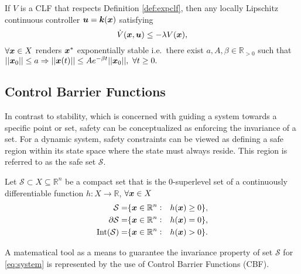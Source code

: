 \begin{theorem}\label{th:clftexp}
If $V$ is a CLF that respects Definition \ref{def:expclf}, then any locally Lipschitz continuous controller $\boldsymbol{u}=\boldsymbol{k}(\boldsymbol{x})$ satisfying 
\begin{equation}
\dot{V}(\boldsymbol{x},\boldsymbol{u}) \leq -\lambda V(\boldsymbol{x}),
\end{equation}
$\forall \boldsymbol{x} \in X$ renders $\boldsymbol{x}^*$ exponentially stable i.e.~there exist $a,A,\beta \in \mathbb{R}_{>0}$ such that 
$|| \boldsymbol{x}_0 || \leq a \Rightarrow || \boldsymbol{x}(t) || \leq Ae^{-\beta t}|| \boldsymbol{x}_0 ||,~\forall t\geq 0.$
\end{theorem}

\subsection{Control Barrier Functions}

In contrast to stability, which is concerned with guiding a system towards a specific point or set, safety can be conceptualized as enforcing the invariance of a set. For a dynamic system, safety constraints can be viewed as defining a safe region within its state space
where the state must always reside. This region is referred to as the safe set $\mathcal{S}$. 

\begin{definition} Let $\mathcal{S}\subset X\subseteq \mathbb{R}^n$ be a compact set that is the $0$-superlevel set of a continuously  differentiable function $h:X\to\mathbb{R}$, $\forall \boldsymbol{x} \in X$
    \begin{equation}
        \begin{aligned}
\mathcal{S} =& \{\boldsymbol{x}\in\mathbb{R}^n :& h(\boldsymbol{x})\geq 0\}, \\
\partial{\mathcal{S}} =& \{\boldsymbol{x}\in\mathbb{R}^n :& h(\boldsymbol{x})= 0\}, \\
\mathrm{Int}({\mathcal{S}}) =& \{\boldsymbol{x}\in\mathbb{R}^n :& h(\boldsymbol{x})> 0\}. \\
\end{aligned}
\end{equation}
\end{definition}
\noindent
A matematical tool as a means to guarantee the invariance property of set $\mathcal{S}$ for \eqref{eq:system} is represented by the use of Control Barrier Functions (CBF).

